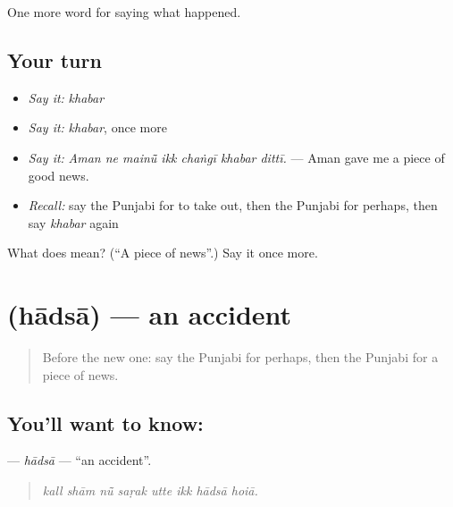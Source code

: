 \begin{grammarlens}[title={What you've built}]
One more word for saying what happened.
\end{grammarlens}

\subsection*{Your turn}
\begin{itemize}
\raggedright
  \item \emph{Say it:} \emph{khabar}
  \item \emph{Say it:} \emph{khabar}, once more
  \item \emph{Say it:} \emph{Aman ne mainū̃ ikk chaṅgī khabar dittī.} — Aman gave me a piece of good news.
  \item \emph{Recall:} say the Punjabi for to take out, then the Punjabi for perhaps, then say \emph{khabar} again
\end{itemize}

\begin{tcolorbox}[breakable,colback=teal!4,colframe=teal!35!black,title={Before you move on}]
What does  mean? (\textquotedblleft{}A piece of news\textquotedblright{}.) Say it once more.
\end{tcolorbox}
\section[\texorpdfstring{\pa{ਹਾਦਸਾ} (hādsā)}{ਹਾਦਸਾ (hādsā)}]{ (hādsā) — an accident}

\label{lesson:PA-C309-hadsa}



\begin{quote}
Before the new one: say the Punjabi for perhaps, then the Punjabi for a piece of news.
\end{quote}

\subsection*{You'll want to know: }
\textbf{} — \emph{hādsā} — \textquotedblleft{}an accident\textquotedblright{}.

\begin{quote}
       
\end{quote}

\begin{quote}
\emph{kall shām nū̃ saṛak utte ikk hādsā hoiā.}
\end{quote}

